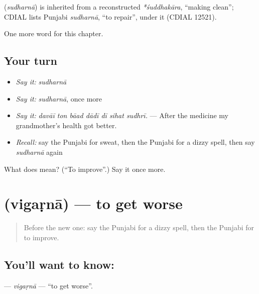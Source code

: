 \begin{cousinweb}
\textbf{} (\emph{sudharnā}) is inherited from a reconstructed \emph{*śuddhakāra}, \textquotedblleft{}making clean\textquotedblright{}; CDIAL lists Punjabi \emph{sudharnā}, \textquotedblleft{}to repair\textquotedblright{}, under it (CDIAL 12521).
\end{cousinweb}

\begin{grammarlens}[title={What you've built}]
One more word for this chapter.
\end{grammarlens}

\subsection*{Your turn}
\begin{itemize}
\raggedright
  \item \emph{Say it:} \emph{sudharnā}
  \item \emph{Say it:} \emph{sudharnā}, once more
  \item \emph{Say it:} \emph{davāī ton bāad dādī dī sihat sudhrī.} — After the medicine my grandmother's health got better.
  \item \emph{Recall:} say the Punjabi for sweat, then the Punjabi for a dizzy spell, then say \emph{sudharnā} again
\end{itemize}

\begin{tcolorbox}[breakable,colback=teal!4,colframe=teal!35!black,title={Before you move on}]
What does  mean? (\textquotedblleft{}To improve\textquotedblright{}.) Say it once more.
\end{tcolorbox}
\section[\texorpdfstring{\pa{ਵਿਗੜਨਾ} (vigaṛnā)}{ਵਿਗੜਨਾ (vigaṛnā)}]{ (vigaṛnā) — to get worse}

\label{lesson:PA-C325-vigarna}



\begin{quote}
Before the new one: say the Punjabi for a dizzy spell, then the Punjabi for to improve.
\end{quote}

\subsection*{You'll want to know: }
\textbf{} — \emph{vigaṛnā} — \textquotedblleft{}to get worse\textquotedblright{}.

